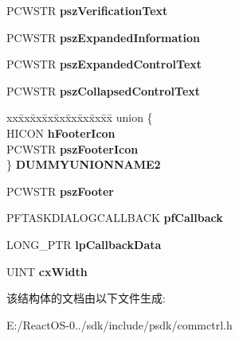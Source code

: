 \begin{DoxyCompactItemize}
P\+C\+W\+S\+TR {\bfseries psz\+Verification\+Text}
\item 
\mbox{\label{struct___t_a_s_k_d_i_a_l_o_g_c_o_n_f_i_g_a3ec0ca053a8485d9d224084b979cb59b}} 
P\+C\+W\+S\+TR {\bfseries psz\+Expanded\+Information}
\item 
\mbox{\label{struct___t_a_s_k_d_i_a_l_o_g_c_o_n_f_i_g_ac6bf8fcaa9e8e23b8df0993f1e7e635a}} 
P\+C\+W\+S\+TR {\bfseries psz\+Expanded\+Control\+Text}
\item 
\mbox{\label{struct___t_a_s_k_d_i_a_l_o_g_c_o_n_f_i_g_a69b05f5338dc4c20e1cbad9b76732512}} 
P\+C\+W\+S\+TR {\bfseries psz\+Collapsed\+Control\+Text}
\item 
\mbox{\label{struct___t_a_s_k_d_i_a_l_o_g_c_o_n_f_i_g_a36b06440fa1eedc09a037aa6c574f5d6}} 
\begin{tabbing}
xx\=xx\=xx\=xx\=xx\=xx\=xx\=xx\=xx\=\kill
union \{\\
\>HICON {\bfseries hFooterIcon}\\
\>PCWSTR {\bfseries pszFooterIcon}\\
\} {\bfseries DUMMYUNIONNAME2}\\

\end{tabbing}\item 
\mbox{\label{struct___t_a_s_k_d_i_a_l_o_g_c_o_n_f_i_g_a018616c59153aa305e6af62b98766bfe}} 
P\+C\+W\+S\+TR {\bfseries psz\+Footer}
\item 
\mbox{\label{struct___t_a_s_k_d_i_a_l_o_g_c_o_n_f_i_g_a422660adc820e8c480c64d6929a99b2b}} 
P\+F\+T\+A\+S\+K\+D\+I\+A\+L\+O\+G\+C\+A\+L\+L\+B\+A\+CK {\bfseries pf\+Callback}
\item 
\mbox{\label{struct___t_a_s_k_d_i_a_l_o_g_c_o_n_f_i_g_a883c4a04df06a0364ee5de7452aa2803}} 
L\+O\+N\+G\+\_\+\+P\+TR {\bfseries lp\+Callback\+Data}
\item 
\mbox{\label{struct___t_a_s_k_d_i_a_l_o_g_c_o_n_f_i_g_a783704b000893b82f38c6027bdd64040}} 
U\+I\+NT {\bfseries cx\+Width}
\end{DoxyCompactItemize}


该结构体的文档由以下文件生成\+:\begin{DoxyCompactItemize}
\item 
E\+:/\+React\+O\+S-\/0../sdk/include/psdk/commctrl.\+h\end{DoxyCompactItemize}
